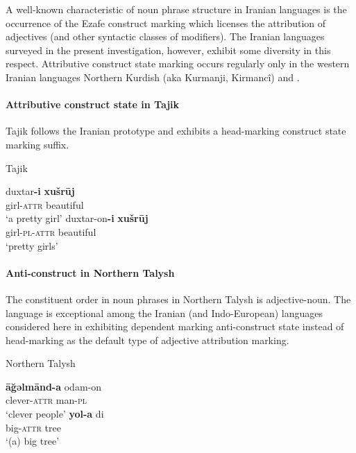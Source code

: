A well-known characteristic of noun phrase structure in Iranian languages is the occurrence of the Ezafe construct marking which licenses the attribution of adjectives (and other syntactic classes of modifiers). The Iranian languages surveyed in the present investigation, however, exhibit some diversity in this respect. Attributive construct state marking occurs regularly only in the western Iranian languages Northern Kurdish (aka Kurmanji, Kirmancî) and .

\paragraph*{Attributive construct state in Tajik}
Tajik follows the Iranian prototype and exhibits a head-marking construct state marking suffix.
\begin{exe}
\ex \rm{Tajik \citep{rastorgueva1963}}
\begin{xlist}
\ex
\gll	duxtar\textbf{-i} \textbf{xušrūj}\\
	girl-\textsc{attr} beautiful\\
\glt	‘a pretty girl’
\ex
\gll	duxtar-on\textbf{-i} \textbf{xušrūj}\\
	girl-\textsc{pl}-\textsc{attr} beautiful\\
\glt	‘pretty girls’
\end{xlist}
\end{exe}

\paragraph*{Anti\hyp{}construct in Northern Talysh} \label{talysh synchr}
The constituent order in noun phrases in Northern Talysh is adjective-noun. The language is exceptional among the Iranian (and Indo-European) languages considered here in exhibiting dependent marking anti\hyp{}construct state instead of head-marking  as the default type of adjective attribution marking.
\begin{exe}
\ex \rm{Northern Talysh \citep[27]{schulze2000}}%
\begin{xlist}
\ex
\gll	\textbf{āğəlmānd-a} odam-on\\
	clever-\textsc{attr} man-\textsc{pl}\\
\glt	‘clever people’
\ex
\gll	\textbf{yol-a} di\\
	big-\textsc{attr} tree\\
\glt	‘(a) big tree’
\end{xlist}
\end{exe}


